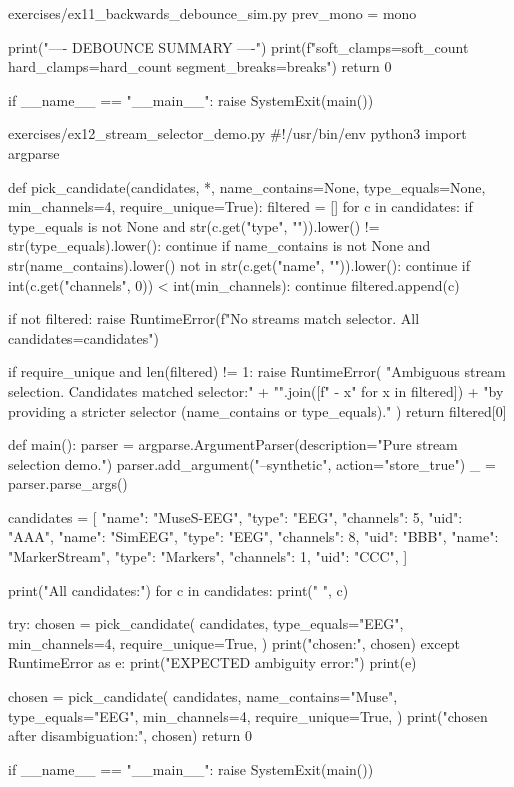 \documentclass[11pt,openany]{book}
\begin{document}
\begin{filecontents*}{exercises/ex11_backwards_debounce_sim.py}
        prev_mono = mono

    print("---- DEBOUNCE SUMMARY ----")
    print(f"soft_clamps={soft_count} hard_clamps={hard_count} segment_breaks={breaks}")
    return 0


if __name__ == "__main__":
    raise SystemExit(main())
\end{filecontents*}

\begin{filecontents*}{exercises/ex12_stream_selector_demo.py}
#!/usr/bin/env python3
import argparse


def pick_candidate(candidates, *, name_contains=None, type_equals=None, min_channels=4, require_unique=True):
    filtered = []
    for c in candidates:
        if type_equals is not None and str(c.get("type", "")).lower() != str(type_equals).lower():
            continue
        if name_contains is not None and str(name_contains).lower() not in str(c.get("name", "")).lower():
            continue
        if int(c.get("channels", 0)) < int(min_channels):
            continue
        filtered.append(c)

    if not filtered:
        raise RuntimeError(f"No streams match selector. All candidates={candidates}")

    if require_unique and len(filtered) != 1:
        raise RuntimeError(
            "Ambiguous stream selection. Candidates matched selector:\n"
            + "\n".join([f"  - {x}" for x in filtered])
            + "\nFix by providing a stricter selector (name_contains or type_equals)."
        )
    return filtered[0]


def main():
    parser = argparse.ArgumentParser(description="Pure stream selection demo.")
    parser.add_argument("--synthetic", action="store_true")
    _ = parser.parse_args()

    candidates = [
        {"name": "MuseS-EEG", "type": "EEG", "channels": 5, "uid": "AAA"},
        {"name": "SimEEG", "type": "EEG", "channels": 8, "uid": "BBB"},
        {"name": "MarkerStream", "type": "Markers", "channels": 1, "uid": "CCC"},
    ]

    print("All candidates:")
    for c in candidates:
        print(" ", c)

    try:
        chosen = pick_candidate(
            candidates,
            type_equals="EEG",
            min_channels=4,
            require_unique=True,
        )
        print("chosen:", chosen)
    except RuntimeError as e:
        print("EXPECTED ambiguity error:")
        print(e)

    chosen = pick_candidate(
        candidates,
        name_contains="Muse",
        type_equals="EEG",
        min_channels=4,
        require_unique=True,
    )
    print("chosen after disambiguation:", chosen)
    return 0


if __name__ == "__main__":
    raise SystemExit(main())
\end{filecontents*}
\end{document}

